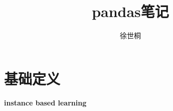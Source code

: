 \documentclass[UTF8]{ctexart}
\title{pandas笔记}
\author{徐世桐}
\date{}
\begin{document}
\maketitle

\section{基础定义}
\noindent \textbf{instance based learning}

  
\end{document}
